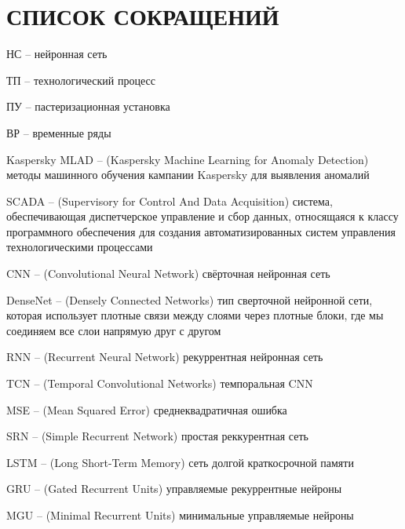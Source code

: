\sectionbreak \section*{ 
    \gostTitleFont
    \redline
    СПИСОК СОКРАЩЕНИЙ
}
\titlespace

{\gostFont

\par \redline НС {--} нейронная сеть

\par \redline ТП {--} технологический процесс 

\par \redline ПУ {--} пастеризационная установка

\par \redline ВР {--} временные ряды

\par \redline Kaspersky MLAD {--} (Kaspersky Machine Learning for Anomaly Detection) методы машинного обучения кампании Kaspersky для выявления аномалий

\par \redline SCADA {--} (Supervisory for Control And Data Acquisition) система, обеспечивающая диспетчерское управление и сбор данных, относящаяся к классу программного обеспечения для создания автоматизированных систем управления технологическими процессами

\par \redline CNN {--} (Convolutional Neural Network) свёрточная нейронная сеть

\par \redline DenseNet {--} (Densely Connected Networks) тип сверточной нейронной сети, которая использует плотные связи между слоями через плотные блоки, где мы соединяем все слои напрямую друг с другом

\par \redline RNN {--} (Recurrent Neural Network) рекуррентная нейронная сеть

\par \redline TCN {--} (Temporal Convolutional Networks) темпоральная CNN

\par \redline MSE {--} (Mean Squared Error) среднеквадратичная ошибка

\par \redline SRN {--} (Simple Recurrent Network) простая реккурентная сеть

\par \redline LSTM {--} (Long Short-Term Memory) сеть долгой краткосрочной памяти

\par \redline GRU {--} (Gated Recurrent Units) управляемые рекуррентные нейроны

\par \redline MGU {--} (Minimal Recurrent Units) минимальные управляемые нейроны

\par 

}
